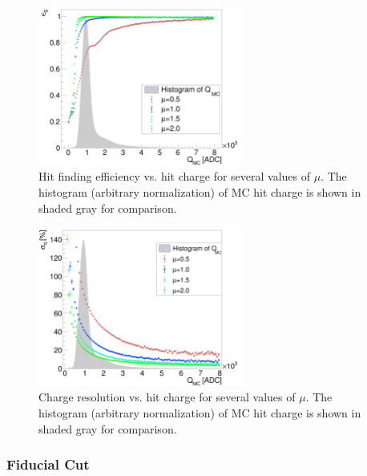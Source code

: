 \documentclass[10pt,a4paper]{article}
\begin{document}
\begin{figure}
\centering
\includegraphics[width=0.6\textwidth]{effcharge.png}
\caption{Hit finding efficiency vs. hit charge for several values of $\mu$. The histogram (arbitrary normalization) of MC hit charge is shown in shaded gray for comparison.}
\label{fig:effcharge}
\end{figure}

\begin{figure}
\centering
\includegraphics[width=0.6\textwidth]{resolution.png}
\caption{Charge resolution vs. hit charge for several values of $\mu$. The histogram (arbitrary normalization) of MC hit charge is shown in shaded gray for comparison.}
\label{fig:chgresol}
\end{figure}

\subsubsection{Fiducial Cut}\label{sec:fiducialcut}
\end{document}
